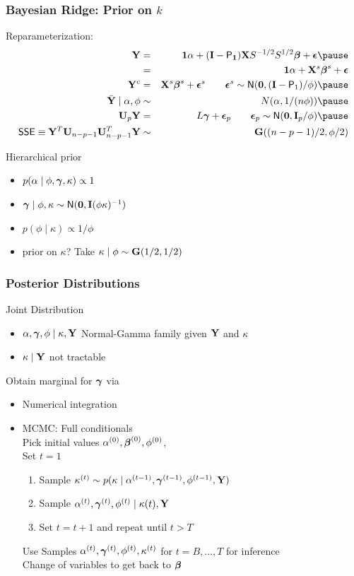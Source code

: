 \documentclass[handout]{beamer}
\begin{document}
\begin{frame}
  \frametitle{Bayesian Ridge: Prior on $k$}
  Reparameterization:
  \begin{eqnarray*}
  \Y  & =  &\one \alpha + (\I - \P_{\one}) \X S^{-1/2} S^{1/2} \b +
  \eps   \pause \\
      & = & \one \alpha + \X^s \b^s + \eps\\
 \Y^c & = & \X^s\b^s + \eps^s \qquad \eps^s \sim \N(\zero, (\I -
 \P_{1})/\phi) \pause \\
 \Ybar \mid \alpha, \phi & \sim & N(\alpha, 1/(n \phi)) \pause \\
 \U_{p} \Y & = &  L \g + \eps_p \qquad  \eps_p \sim \N(\zero,
 \I_p/\phi) \pause \\
\SSE \equiv \Y^T \U_{n-p-1} \U_{n-p-1}^T \Y  & \sim & \G( (n-p-1)/2, \phi/2)
  \end{eqnarray*}

Hierarchical prior \pause
\begin{itemize}
\item $p(\alpha \mid \phi, \boldsymbol{\gamma}, \kappa) \propto 1$ \pause
\item $\boldsymbol{\gamma} \mid \phi, \kappa \sim \textsf{N}(\mathbf{0}, \mathbf{I} (\phi \kappa )^{-1})$ \pause
\item $p(\phi \mid \kappa) \propto 1/\phi$
\item prior on $\kappa$?  Take $\kappa \mid \phi \sim  \mathbf{G}(1/2, 1/2)$ \pause
\end{itemize}
\end{frame}
\begin{frame}
  \frametitle{Posterior Distributions}
Joint Distribution
  \begin{itemize}
  \item $\alpha, \boldsymbol{\gamma}, \phi \mid \kappa, \mathbf{Y}$  Normal-Gamma family given $\mathbf{Y}$
    and $\kappa$ \pause
  \item $\kappa \mid \mathbf{Y}$  not tractable \pause
  \end{itemize}
Obtain marginal for  $\boldsymbol{\gamma}$ via  \pause
\begin{itemize}
\item Numerical integration \pause
\item MCMC:  Full conditionals \pause \\  Pick initial values $\alpha^{(0)}, \boldsymbol{\beta}^{(0)},
  \phi^{(0)}$, \pause \\
  Set  $t = 1$
  \begin{enumerate}
  \item Sample $\kappa^{(t)} \sim p(\kappa \mid \alpha^{(t-1)},
    \boldsymbol{\gamma}^{(t-1)}, \phi^{(t-1)}, \mathbf{Y})$ \pause
   \item Sample $\alpha^{(t)}, \boldsymbol{\gamma}^{(t)}, \phi^{(t)} \mid \kappa(t),
     \mathbf{Y}$ \pause
 \item Set $t = t + 1$ and repeat until $t > T$ \pause
  \end{enumerate}
Use Samples  $\alpha^{(t)}, \boldsymbol{\gamma}^{(t)}, \phi^{(t)}, \kappa^{(t)}$ for $t
= B, \ldots, T$ for inference \\
Change of variables to get back to $\boldsymbol{\beta}$
\end{itemize}
\end{frame}
\end{document}

